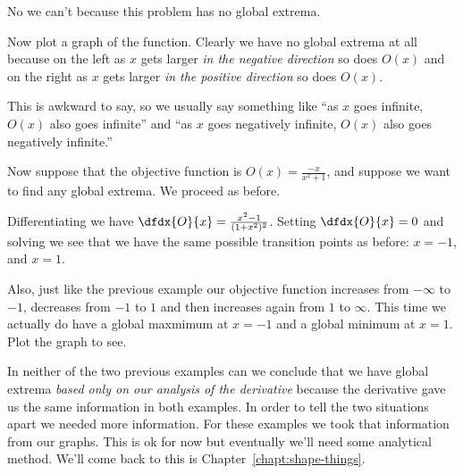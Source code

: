 \begin{myexample}
    No we can't because this problem has no global extrema.

    Now plot a graph of the function. Clearly we have no global
    extrema at all because on the left as $x$ gets larger \emph{in the
      negative direction} so does $O(x)$ and on the right as $x$ gets
    larger \emph{in the positive direction} so does $O(x)$.


    This is awkward to say, so we usually say something like ``as $x$ goes infinite, $O(x)$ also goes
    infinite'' and ``as $x$ goes negatively infinite, $O(x)$ also goes
    negatively infinite.''
  \end{myexample}
  \begin{myexample}
    Now suppose that the objective function is
    $O(x)=\frac{-x}{x^2+1}$, and suppose we want to find any global
    extrema. We proceed as before.

    Differentiating we have
    $\dfdx{O}{x}=\frac{x^2-1}{(1+x^2)^2}$. Setting $\dfdx{O}{x}=0$ and
    solving we see that we have the same possible transition points as
    before: $x=-1$, and $x=1$.

    Also, just like the previous example our objective function
    increases from $-\infty$ to $-1$, decreases from $-1$ to $1$ and
    then increases again from $1$ to $\infty$.  This time we actually
    do have a global maxmimum at $x=-1$ and a global minimum at
    $x=1$. Plot the graph to see. 
\end{myexample}

  
  In neither of the two previous examples can we conclude that we have
  global extrema \emph{based only on our analysis of the derivative}
  because the derivative gave us the same information in both
  examples. In order to tell the two situations apart we needed more
  information. For these examples we took that information from our
  graphs. This is ok for now but eventually we'll need some analytical
  method. We'll come back to this is Chapter~\ref{chapt:shape-things}.


